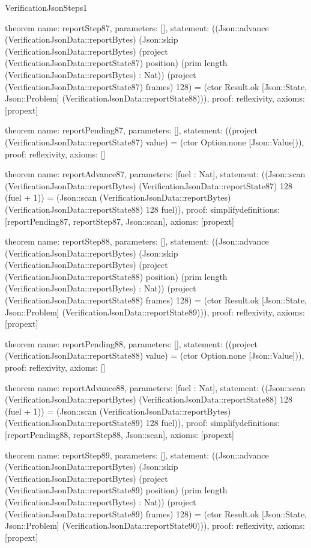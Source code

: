 \begin{lexlean}{VerificationJsonSteps1}
\begin{semanticmodule}
theorem{
  name: reportStep87,
  parameters: [],
  statement: ((Json::advance (VerificationJsonData::reportBytes) (Json::skip (VerificationJsonData::reportBytes) (project (VerificationJsonData::reportState87) position) (prim length (VerificationJsonData::reportBytes) : Nat)) (project (VerificationJsonData::reportState87) frames) 128) = (ctor Result.ok [Json::State, Json::Problem] (VerificationJsonData::reportState88))),
  proof: reflexivity{},
  axioms: [propext]
}

theorem{
  name: reportPending87,
  parameters: [],
  statement: ((project (VerificationJsonData::reportState87) value) = (ctor Option.none [Json::Value])),
  proof: reflexivity{},
  axioms: []
}

theorem{
  name: reportAdvance87,
  parameters: [fuel : Nat],
  statement: ((Json::scan (VerificationJsonData::reportBytes) (VerificationJsonData::reportState87) 128 (fuel + 1)) = (Json::scan (VerificationJsonData::reportBytes) (VerificationJsonData::reportState88) 128 fuel)),
  proof: simplify{definitions: [reportPending87, reportStep87, Json::scan]},
  axioms: [propext]
}

theorem{
  name: reportStep88,
  parameters: [],
  statement: ((Json::advance (VerificationJsonData::reportBytes) (Json::skip (VerificationJsonData::reportBytes) (project (VerificationJsonData::reportState88) position) (prim length (VerificationJsonData::reportBytes) : Nat)) (project (VerificationJsonData::reportState88) frames) 128) = (ctor Result.ok [Json::State, Json::Problem] (VerificationJsonData::reportState89))),
  proof: reflexivity{},
  axioms: [propext]
}

theorem{
  name: reportPending88,
  parameters: [],
  statement: ((project (VerificationJsonData::reportState88) value) = (ctor Option.none [Json::Value])),
  proof: reflexivity{},
  axioms: []
}

theorem{
  name: reportAdvance88,
  parameters: [fuel : Nat],
  statement: ((Json::scan (VerificationJsonData::reportBytes) (VerificationJsonData::reportState88) 128 (fuel + 1)) = (Json::scan (VerificationJsonData::reportBytes) (VerificationJsonData::reportState89) 128 fuel)),
  proof: simplify{definitions: [reportPending88, reportStep88, Json::scan]},
  axioms: [propext]
}

theorem{
  name: reportStep89,
  parameters: [],
  statement: ((Json::advance (VerificationJsonData::reportBytes) (Json::skip (VerificationJsonData::reportBytes) (project (VerificationJsonData::reportState89) position) (prim length (VerificationJsonData::reportBytes) : Nat)) (project (VerificationJsonData::reportState89) frames) 128) = (ctor Result.ok [Json::State, Json::Problem] (VerificationJsonData::reportState90))),
  proof: reflexivity{},
  axioms: [propext]
}


\end{semanticmodule}
\end{lexlean}
